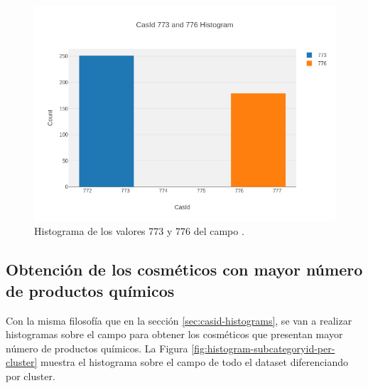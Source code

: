 \newpage
\begin{figure}[!th]
\includegraphics[scale=0.49]{figures/histogram-casid-773-776}
\centering
\caption{Histograma de los valores 773 y 776 del campo .}
\label{fig:histogram-casid-773-776}
\end{figure}









\subsection{Obtención de los cosméticos con mayor número de productos químicos}
\label{sec:subcategoryid-histograms}

Con la misma filosofía que en la sección \ref{sec:casid-histograms}, se van a realizar histogramas sobre el campo  para obtener los cosméticos que presentan mayor número de productos químicos. La Figura \ref{fig:histogram-subcategoryid-per-cluster} muestra el histograma sobre el campo  de todo el dataset diferenciando por cluster.


